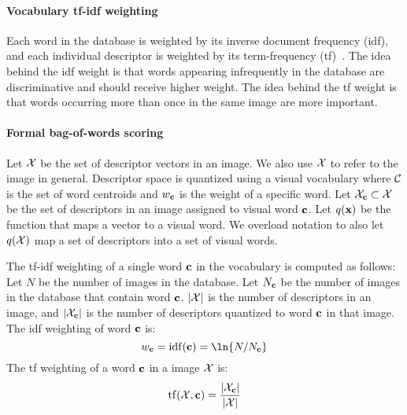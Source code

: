 
        \paragraph{Vocabulary tf-idf weighting}
            Each word in the database is weighted by its inverse document frequency (idf), and each individual
            descriptor is weighted by its term-frequency (tf)~\cite{sivic_efficient_2009}. The idea behind the idf
            weight is that words appearing infrequently in the database are discriminative and should receive
            higher weight. The idea behind the tf weight is that words occurring more than once in the same image
            are more important.

        \paragraph{Formal bag-of-words scoring}
            Let $\mathcal{X}$ be the set of descriptor vectors in an image. We also use $\mathcal{X}$ to refer to the image in
            general. Descriptor space is quantized using a visual vocabulary where $\mathcal{C}$ is the set of word
            centroids and $w_{\mathbf{c}}$ is the weight of a specific word. Let $\mathcal{X}_{\mathbf{c}} \subset \mathcal{X}$ be the set of descriptors
            in an image assigned to visual word $\mathbf{c}$. Let $q(\mathbf{x})$ be the function that maps a vector to a visual
            word. We overload notation to also let $q(\mathcal{X})$ map a set of descriptors into a set of visual words.

            The tf-idf weighting of a single word $\mathbf{c}$ in the vocabulary is computed as follows: Let $N$ be the
            number of images in the database. Let $N_{\mathbf{c}}$ be the number of images in the database that contain word
            $\mathbf{c}$. $|\mathcal{X}|$ is the number of descriptors in an image, and $|\mathcal{X}_{\mathbf{c}}|$ is the number of
            descriptors quantized to word $\mathbf{c}$ in that image. The idf weighting of word $\mathbf{c}$ is:
            \begin{equation}
                w_\c = \opname{idf}(\c) = \ln{N/N_\c}
            \end{equation}
            The tf weighting of a word $\mathbf{c}$ in a image $\mathcal{X}$ is:
            \begin{equation}
                \operatorname{tf}(\mathcal{X}, \mathbf{c}) = \frac{|\mathcal{X}_{\mathbf{c}}|}{|\mathcal{X}|}
            \end{equation}

